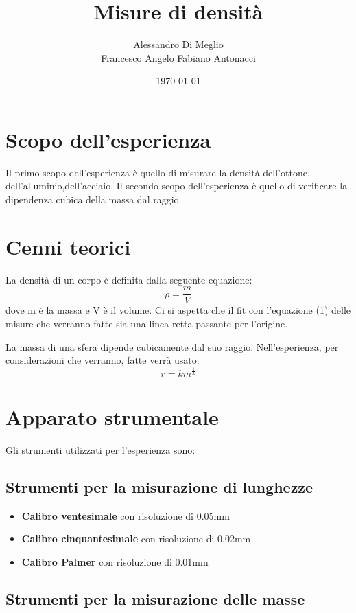 \documentclass{article}
\title{Misure di densità}
\author{Alessandro Di Meglio\\Francesco Angelo Fabiano Antonacci}
\date{\today}
\begin{document}
\maketitle{}


\section{Scopo dell'esperienza}
Il primo scopo dell'esperienza è quello di misurare la densità dell'ottone, dell'alluminio,dell'acciaio.
Il secondo scopo dell'esperienza è quello di verificare la dipendenza cubica della massa dal raggio.

\section{Cenni teorici}
La densità di un corpo è definita dalla seguente equazione:
\begin{equation}
\rho = \frac{m}{V}
\end{equation}
dove m è la massa e V è il volume.
Ci si aspetta che il fit con l'equazione (1) delle misure che verranno fatte sia una linea retta passante per l'origine.

La massa di una sfera dipende cubicamente dal suo raggio. Nell'esperienza, per  considerazioni che verranno, fatte verrà usato:
\begin{equation}
r=km^\frac{1}{3}
\end{equation}


\section{Apparato strumentale}
Gli strumenti utilizzati per l'esperienza sono:

\subsection{Strumenti per la misurazione di lunghezze}
\begin{itemize}
\item \textbf{Calibro ventesimale}  con risoluzione di 0.05mm
\item \textbf{Calibro cinquantesimale} con risoluzione di 0.02mm
\item \textbf{Calibro Palmer} con risoluzione di 0.01mm
\end{itemize}
\subsection{Strumenti per la misurazione delle masse}
\end{document}
